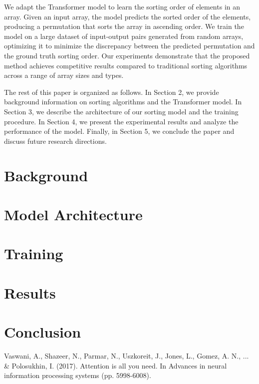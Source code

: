 \documentclass{article}
\begin{document}
We adapt the Transformer model to learn the sorting order of elements in an array. Given an input array, the model predicts the sorted order of the elements, producing a permutation that sorts the array in ascending order. We train the model on a large dataset of input-output pairs generated from random arrays, optimizing it to minimize the discrepancy between the predicted permutation and the ground truth sorting order. Our experiments demonstrate that the proposed method achieves competitive results compared to traditional sorting algorithms across a range of array sizes and types.

The rest of this paper is organized as follows. In Section 2, we provide background information on sorting algorithms and the Transformer model. In Section 3, we describe the architecture of our sorting model and the training procedure. In Section 4, we present the experimental results and analyze the performance of the model. Finally, in Section 5, we conclude the paper and\cite{vaswani2017attention} discuss future research directions.


\section{Background}


\section{Model Architecture}

\section{Training}

\section{Results}

\section{Conclusion}


\begin{thebibliography}{9}
    Vaswani, A., Shazeer, N., Parmar, N., Uszkoreit, J., Jones, L., Gomez, A. N., ... \& Polosukhin, I. (2017). Attention is all you need. In Advances in neural information processing systems (pp. 5998-6008).
\end{thebibliography}
\end{document}
